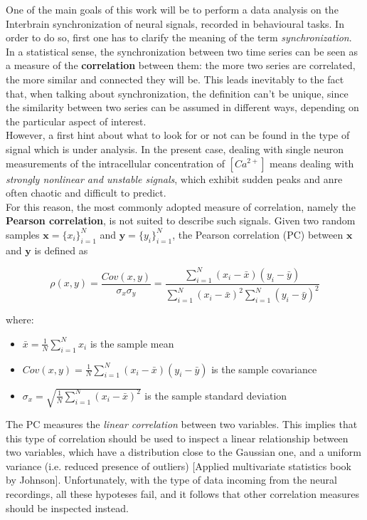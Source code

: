 \documentclass[a4paper]{article}
\begin{document}
One of the main goals of this work will be to perform a data analysis on the Interbrain synchronization of neural signals, recorded in behavioural tasks. In order to do so, first one has to clarify the meaning of the term  \textit{synchronization}.\\
In a statistical sense, the synchronization between two time series can be seen as a measure of the \textbf{correlation} between them: the more two series are correlated, the more similar and connected they will be. This leads inevitably to the fact that, when talking about synchronization, the definition can't be unique, since the similarity between two series can be assumed in different ways, depending on the particular aspect of interest. \\
However, a first hint about what to look for or not can be found in the type of signal which is under analysis. In the present case, dealing with single neuron measurements of the intracellular concentration of $[Ca^{2+}]$ means dealing with \textit{strongly nonlinear and unstable signals}, which exhibit sudden peaks and anre often chaotic and difficult to predict.\\
For this reason, the most commonly adopted measure of correlation, namely the \textbf{Pearson correlation}, is not suited to describe such signals. Given two random samples $ \textbf{x} = \{x_i\}_{i=1}^N$ and  $ \textbf{y} = \{y_i\}_{i=1}^N$, the Pearson correlation (PC) between  $ \textbf{x}$ and  $ \textbf{y}$ is defined as

$$ \rho(x,y) = \frac{Cov(x,y)}{\sigma_x \sigma_y} = \frac{\sum_{i=1}^{N}(x_i-\bar{x}) (y_i-\bar{y})} {\sum_{i=1}^{N}(x_i-\bar{x})^2 \sum_{i=1}^{N} (y_i-\bar{y})^2} $$

where:
\begin{itemize}
	\item $ \bar{x} = \frac{1}{N}\sum_{i=1}^{N}x_i$ is the sample mean
	
	\item $Cov(x,y) = \frac{1}{N}\sum_{i=1}^{N}(x_i-\bar{x}) (y_i-\bar{y})$ is the sample covariance
	
	\item $\sigma_x = \sqrt{\frac{1}{N}\sum_{i=1}^{N}(x_i-\bar{x})^2}$ is the sample standard deviation
\end{itemize}

The PC measures the \textit{linear correlation} between two variables. This implies that this type of correlation should be used to inspect a linear relationship between two variables, which have a distribution close to the Gaussian one, and a uniform variance (i.e. reduced presence of outliers) [Applied multivariate statistics book by Johnson]. Unfortunately, with the type of data incoming from the neural recordings, all these hypoteses fail, and it follows that other correlation measures should be inspected instead.
\end{document}
